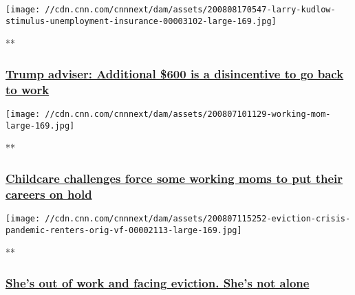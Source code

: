 \href{/videos/business/2020/08/07/larry-kudlow-stimulus-unemployment-insurance.cnnbusiness/video/playlists/business-economy/}{}

\texttt{[image: //cdn.cnn.com/cnnnext/dam/assets/200808170547-larry-kudlow-stimulus-unemployment-insurance-00003102-large-169.jpg]}

**

\hypertarget{trump-adviser-additional-600-is-a-disincentive-to-go-back-to-work}{%
\subsubsection{\texorpdfstring{\href{/videos/business/2020/08/07/larry-kudlow-stimulus-unemployment-insurance.cnnbusiness/video/playlists/business-economy/}{Trump
adviser: Additional \$600 is a disincentive to go back to
work}}{Trump adviser: Additional \$600 is a disincentive to go back to work}}\label{trump-adviser-additional-600-is-a-disincentive-to-go-back-to-work}}

\href{/videos/business/2020/08/07/working-moms-childcare-remote-learning-school-coronavirus-covid-19.cnnbusiness/video/playlists/business-economy/}{}

\texttt{[image: //cdn.cnn.com/cnnnext/dam/assets/200807101129-working-mom-large-169.jpg]}

**

\hypertarget{childcare-challenges-force-some-working-moms-to-put-their-careers-on-hold}{%
\subsubsection{\texorpdfstring{\href{/videos/business/2020/08/07/working-moms-childcare-remote-learning-school-coronavirus-covid-19.cnnbusiness/video/playlists/business-economy/}{Childcare
challenges force some working moms to put their careers on
hold}}{Childcare challenges force some working moms to put their careers on hold}}\label{childcare-challenges-force-some-working-moms-to-put-their-careers-on-hold}}

\href{/videos/economy/2020/08/07/eviction-crisis-pandemic-renters-orig-vf.cnn/video/playlists/business-economy/}{}

\texttt{[image: //cdn.cnn.com/cnnnext/dam/assets/200807115252-eviction-crisis-pandemic-renters-orig-vf-00002113-large-169.jpg]}

**

\hypertarget{shes-out-of-work-and-facing-eviction-shes-not-alone}{%
\subsubsection{\texorpdfstring{\href{/videos/economy/2020/08/07/eviction-crisis-pandemic-renters-orig-vf.cnn/video/playlists/business-economy/}{She's
out of work and facing eviction. She's not
alone}}{She's out of work and facing eviction. She's not alone}}\label{shes-out-of-work-and-facing-eviction-shes-not-alone}}

